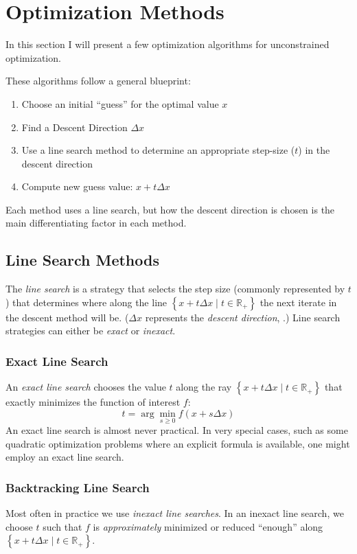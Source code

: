 \section{Optimization Methods}

In this section I will present a few optimization algorithms for unconstrained optimization.

These algorithms follow a general blueprint:
\begin{enumerate}
	\item Choose an initial ``guess'' for the optimal value $x$
	\item Find a Descent Direction $\Delta x$
	\item Use a line search method to determine an appropriate step-size ($t$) in the descent direction
	\item Compute new guess value: $x+t\Delta x$
\end{enumerate}

Each method uses a line search, but how the descent direction is chosen is the main differentiating factor in each method.

\subsection{Line Search Methods}

The \textit{line search} is a strategy that selects the step size (commonly represented by $t$) that determines where along the line $\left\lbrace x+t\Delta x\mid t\in\mathbb{R}_+\right\rbrace$ the next iterate in the descent method will be. ($\Delta x$ represents the \textit{descent direction}, .) Line search strategies can either be \textit{exact} or \textit{inexact}.

\subsubsection*{Exact Line Search}

An \textit{exact line search} chooses the value $t$ along the ray $\left\lbrace x+t\Delta x\mid t\in\mathbb{R}_+\right\rbrace$ that exactly minimizes the function of interest $f$:
$$t=\arg\min_{s\geq 0}f(x+s\Delta x)$$
An exact line search is almost never practical. In very special cases, such as some quadratic optimization problems where an explicit formula is available, one might employ an exact line search.

\subsubsection*{Backtracking Line Search}
Most often in practice we use \textit{inexact line searches}. In an inexact line search, we choose $t$ such that $f$ is \textit{approximately} minimized or reduced ``enough'' along $\left\lbrace x+t\Delta x\mid t\in\mathbb{R}_+\right\rbrace$.

